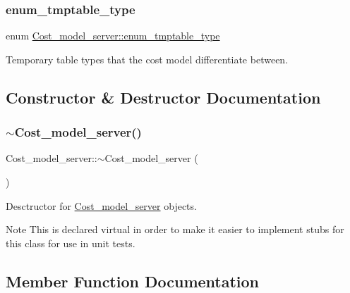 \subsubsection{\texorpdfstring{enum\+\_\+tmptable\+\_\+type}{enum\_tmptable\_type}}
{\footnotesize\ttfamily enum \mbox{\hyperlink{classCost__model__server_a140ad6035a21dbe363f69eb4b5ea98c0}{Cost\+\_\+model\+\_\+server\+::enum\+\_\+tmptable\+\_\+type}}}

Temporary table types that the cost model differentiate between. 

\subsection{Constructor \& Destructor Documentation}
\mbox{\label{classCost__model__server_a7198ad7c22a47c320d7c9c26b1189a5d}} 
\subsubsection{\texorpdfstring{$\sim$\+Cost\+\_\+model\+\_\+server()}{~Cost\_model\_server()}}
{\footnotesize\ttfamily Cost\+\_\+model\+\_\+server\+::$\sim$\+Cost\+\_\+model\+\_\+server (\begin{DoxyParamCaption}{ }\end{DoxyParamCaption})\hspace{0.3cm}{\ttfamily [virtual]}}

Desctructor for \mbox{\hyperlink{classCost__model__server}{Cost\+\_\+model\+\_\+server}} objects.

\begin{DoxyNote}{Note}
This is declared virtual in order to make it easier to implement stubs for this class for use in unit tests. 
\end{DoxyNote}


\subsection{Member Function Documentation}
\mbox{\label{classCost__model__server_ae2d32c871cdee2b0461b43d43bb24685}} 
